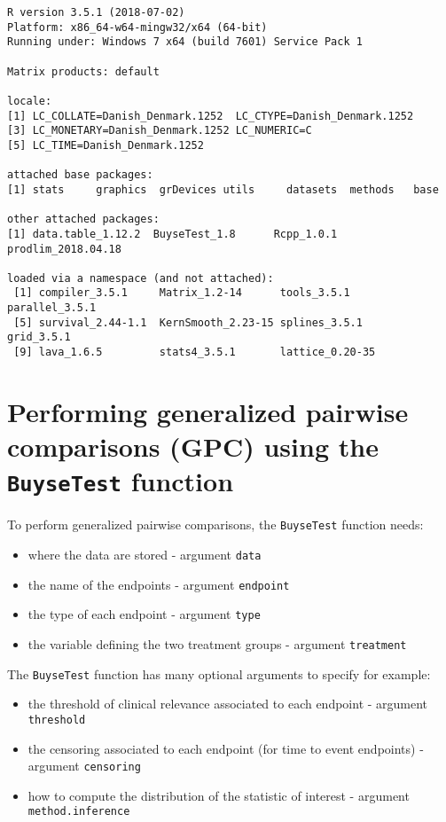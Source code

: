 \documentclass[12pt]{article}
\begin{document}
\begin{verbatim}
R version 3.5.1 (2018-07-02)
Platform: x86_64-w64-mingw32/x64 (64-bit)
Running under: Windows 7 x64 (build 7601) Service Pack 1

Matrix products: default

locale:
[1] LC_COLLATE=Danish_Denmark.1252  LC_CTYPE=Danish_Denmark.1252   
[3] LC_MONETARY=Danish_Denmark.1252 LC_NUMERIC=C                   
[5] LC_TIME=Danish_Denmark.1252    

attached base packages:
[1] stats     graphics  grDevices utils     datasets  methods   base     

other attached packages:
[1] data.table_1.12.2  BuyseTest_1.8      Rcpp_1.0.1         prodlim_2018.04.18

loaded via a namespace (and not attached):
 [1] compiler_3.5.1     Matrix_1.2-14      tools_3.5.1        parallel_3.5.1    
 [5] survival_2.44-1.1  KernSmooth_2.23-15 splines_3.5.1      grid_3.5.1        
 [9] lava_1.6.5         stats4_3.5.1       lattice_0.20-35
\end{verbatim}






\clearpage

\section{Performing generalized pairwise comparisons (GPC) using the \texttt{BuyseTest} function}
\label{sec:orga3920d9}

To perform generalized pairwise comparisons, the \texttt{BuyseTest} function needs:
\begin{itemize}
\item where the data are stored \hfill - argument \texttt{data}
\item the name of the endpoints \hfill - argument \texttt{endpoint}
\item the type of each endpoint \hfill - argument \texttt{type}
\item the variable defining the two treatment groups \hfill - argument
\texttt{treatment}
\end{itemize}
The \texttt{BuyseTest} function has many optional arguments to specify for example:
\begin{itemize}
\item the threshold of clinical relevance associated to each endpoint \hfill - argument \texttt{threshold}
\item the censoring associated to each endpoint (for time to event endpoints) \hfill - argument \texttt{censoring}
\item how to compute the distribution of the statistic of interest \hfill - argument \texttt{method.inference}
\end{itemize}
\end{document}

